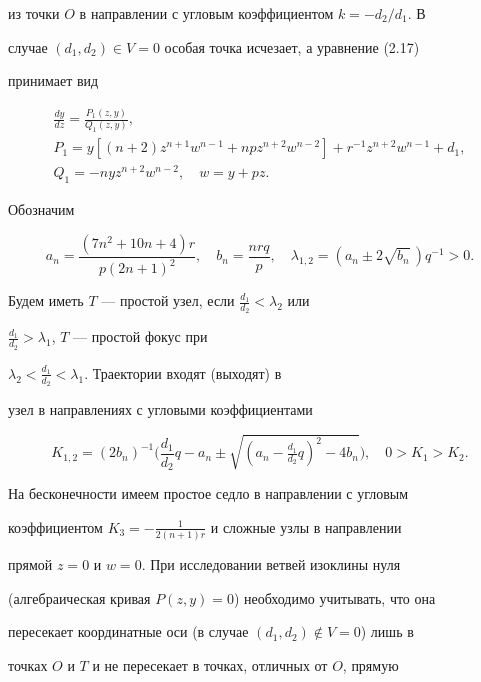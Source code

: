 из точки $O$ в направлении с угловым коэффициентом $k=-d_2/d_1$. В 


случае $(d_1,d_2)\in V=0$ особая точка исчезает, а уравнение (2.17) 


принимает вид 


\begin{gather*} 


\frac{dy}{dz}=\frac{P_1(z,y)}{Q_1(z,y)},\\ 


% 


P_1=y[(n+2)z^{n+1}w^{n-1}+n p z^{n+2}w^{n-2}]+ 


r^{-1}z^{n+2}w^{n-1}+d_1, \\ 


% 


Q_1=-n y z^{n+2}w^{n-2},\quad w=y+p z. 


\end{gather*} 


Обозначим 


$$ 


a_n=\frac{(7n^2+10n+4)r}{p(2n+1)^2},\quad 


b_n=\frac{n r q}{p},\quad \lambda_{1,2}=(a_n\pm2\sqrt{b_n}\,)q^{-1}>0. 


$$ 


Будем иметь $T$ --- простой узел, если $\frac{d_1}{d_2}<\lambda_2$ или 


$\frac{d_1}{d_2}>\lambda_1$, $T$ --- простой фокус при 


$\lambda_2<\frac{d_1}{d_2}<\lambda_1$. Траектории входят (выходят) в 


узел в направлениях с угловыми коэффициентами 


$$ 


K_{1,2}=(2b_n)^{-1}\bigg(\frac{d_1}{d_2}q-a_n\pm 


\sqrt{(a_n-\tfrac{d_1}{d_2}q)^2-4b_n}\bigg),\quad 0>K_1>K_2. 


$$ 


На бесконечности имеем простое седло в направлении с угловым 


коэффициентом $K_3=-\frac{1}{2(n+1)r}$ и сложные узлы в направлении 


прямой $z=0$ и $w=0$. При исследовании ветвей изоклины нуля 


(алгебраическая кривая $P(z,y)=0$) необходимо учитывать, что она 


пересекает координатные оси (в случае $(d_1,d_2)\notin V=0$) лишь в 


точках $O$ и $T$ и не пересекает в точках, отличных от $O$, прямую 


